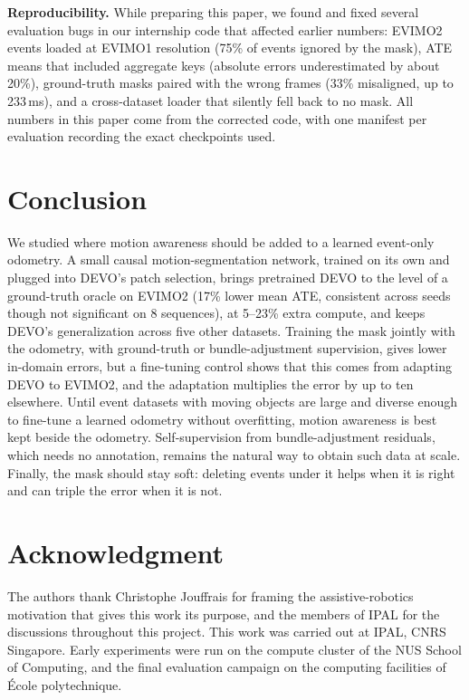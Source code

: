 \documentclass[conference]{IEEEtran}
\begin{document}
\textbf{Reproducibility.} While preparing this paper, we found and fixed several
evaluation bugs in our internship code that affected earlier numbers: EVIMO2 events loaded
at EVIMO1 resolution (75\% of events ignored by the mask), ATE means that included
aggregate keys (absolute errors underestimated by about 20\%), ground-truth masks paired
with the wrong frames (33\% misaligned, up to 233\,ms), and a cross-dataset loader that
silently fell back to no mask. All numbers in this paper come from the corrected code, with
one manifest per evaluation recording the exact checkpoints used.

\section{Conclusion}

We studied where motion awareness should be added to a learned event-only odometry. A
small causal motion-segmentation network, trained on its own and plugged into DEVO's patch
selection, brings pretrained DEVO to the level of a ground-truth oracle on EVIMO2 (17\%
lower mean ATE, consistent across seeds though not significant on 8 sequences), at
5--23\% extra compute, and keeps DEVO's generalization across five other datasets.
Training the mask jointly with the odometry, with ground-truth or bundle-adjustment
supervision, gives lower in-domain errors, but a fine-tuning control shows that this comes
from adapting DEVO to EVIMO2, and the adaptation multiplies the error by up to ten
elsewhere. Until event datasets with moving objects are large and diverse enough to
fine-tune a learned odometry without overfitting, motion awareness is best kept beside the
odometry. Self-supervision from bundle-adjustment residuals, which needs no annotation,
remains the natural way to obtain such data at scale. Finally, the mask should stay soft:
deleting events under it helps when it is right and can triple the error when it is not.

\section*{Acknowledgment}

The authors thank Christophe Jouffrais for framing the assistive-robotics motivation that
gives this work its purpose, and the members of IPAL for the discussions throughout this
project. This work was carried out at IPAL, CNRS Singapore. Early experiments were run on
the compute cluster of the NUS School of Computing, and the final evaluation campaign on the
computing facilities of \'Ecole polytechnique.
\end{document}
